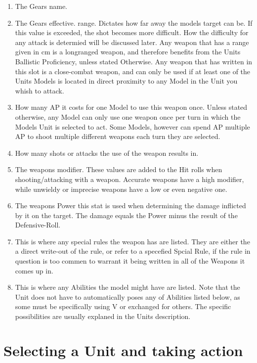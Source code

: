 \documentclass[a4paper,12pt]{book}
\begin{document}
\begin{adjustwidth}{-2cm}{-2cm}
\begin{multicols}{2}
\begin{enumerate}
	\item The Gears name.
	\item The Gears effective. range. Dictates how far away the models target can be. If this value is  exceeded, the shot becomes more difficult. How the difficulty for any attack is determied will be discussed later. Any weapon that has a range given in cm is a longranged weapon, and therefore benefits from the Units Ballistic Proficiency, unless stated Otherwise. Any weapon that has  written in this slot is a close-combat weapon, and can only be used if at least one of the Units Models is located in direct proximity to any Model in the Unit you whish to attack.
	\item How many AP it costs for one Model to use this weapon once. Unless stated otherwise, any Model can only use one weapon once per turn in which the Models Unit is selected to act. Some Models, however can spend AP multiple AP to shoot multiple different weapons each turn they are selected.
	\item How many shots or attacks the use of the weapon results in.
	\item The weapons modifier. These values are added to the Hit rolls when shooting/attacking with a weapon. Accurate weapons have a high modifier, while unwieldy or imprecise weapons have a low or even negative one.
	\item The weapons Power this stat is used when determining the damage inflicted by it on the target. The damage equals the Power minus the result of the Defensive-Roll.
	\item This is where any special rules the weapon has are listed. They are either the a direct write-out of the rule, or refer to a specefied Spcial Rule, if the rule in question is too commen to warrant it being written in all of the Weapons it comes up in.
	\item This is where any Abilities the model might have are listed. Note that the Unit does not have to automatically poses any of Abilities listed below, as some must be specifically  using V or exchanged for others. The specific possibilities are usually explaned in the Units description.
	
\end{enumerate}
\end{multicols}
\end{adjustwidth}



\section{Selecting a Unit and taking action}
\end{document}
